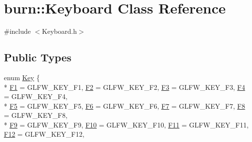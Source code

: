 \hypertarget{classburn_1_1_keyboard}{\section{burn\-:\-:Keyboard Class Reference}
\label{classburn_1_1_keyboard}
}


{\ttfamily \#include $<$Keyboard.\-h$>$}

\subsection*{Public Types}
\begin{DoxyCompactItemize}
\item 
enum \hyperlink{classburn_1_1_keyboard_a2aabfebd78080f013e704415293a4533}{Key} \{ \\*
\hyperlink{classburn_1_1_keyboard_a2aabfebd78080f013e704415293a4533ac6129ac2879eaa94d6be30163b4f7877}{F1} = G\-L\-F\-W\-\_\-\-K\-E\-Y\-\_\-\-F1, 
\hyperlink{classburn_1_1_keyboard_a2aabfebd78080f013e704415293a4533a14274d0e38330812277e7f76a8196089}{F2} = G\-L\-F\-W\-\_\-\-K\-E\-Y\-\_\-\-F2, 
\hyperlink{classburn_1_1_keyboard_a2aabfebd78080f013e704415293a4533a8c874ea48c022f69ba27fbeb67dbf697}{F3} = G\-L\-F\-W\-\_\-\-K\-E\-Y\-\_\-\-F3, 
\hyperlink{classburn_1_1_keyboard_a2aabfebd78080f013e704415293a4533a90b08c831000643534febb9c890095c9}{F4} = G\-L\-F\-W\-\_\-\-K\-E\-Y\-\_\-\-F4, 
\\*
\hyperlink{classburn_1_1_keyboard_a2aabfebd78080f013e704415293a4533a7046d4dcb8608b6ab8deb839fb9ef834}{F5} = G\-L\-F\-W\-\_\-\-K\-E\-Y\-\_\-\-F5, 
\hyperlink{classburn_1_1_keyboard_a2aabfebd78080f013e704415293a4533a68905a78cb4faf1430d44957fa6b6ef8}{F6} = G\-L\-F\-W\-\_\-\-K\-E\-Y\-\_\-\-F6, 
\hyperlink{classburn_1_1_keyboard_a2aabfebd78080f013e704415293a4533ac2b32c682e7f2279dc96ab3c86912f67}{F7} = G\-L\-F\-W\-\_\-\-K\-E\-Y\-\_\-\-F7, 
\hyperlink{classburn_1_1_keyboard_a2aabfebd78080f013e704415293a4533a70aaa3593b568af3ff036fbf9020a696}{F8} = G\-L\-F\-W\-\_\-\-K\-E\-Y\-\_\-\-F8, 
\\*
\hyperlink{classburn_1_1_keyboard_a2aabfebd78080f013e704415293a4533acfe77e09857942fe0c88dae091c73802}{F9} = G\-L\-F\-W\-\_\-\-K\-E\-Y\-\_\-\-F9, 
\hyperlink{classburn_1_1_keyboard_a2aabfebd78080f013e704415293a4533af4ef5fd9a78ebb1000dcf41563844ba2}{F10} = G\-L\-F\-W\-\_\-\-K\-E\-Y\-\_\-\-F10, 
\hyperlink{classburn_1_1_keyboard_a2aabfebd78080f013e704415293a4533aa76df60aa615f5df464778aa81063966}{F11} = G\-L\-F\-W\-\_\-\-K\-E\-Y\-\_\-\-F11, 
\hyperlink{classburn_1_1_keyboard_a2aabfebd78080f013e704415293a4533a18e74185a696327781a4d73081ac2e40}{F12} = G\-L\-F\-W\-\_\-\-K\-E\-Y\-\_\-\-F12, 

\end{DoxyCompactItemize}
